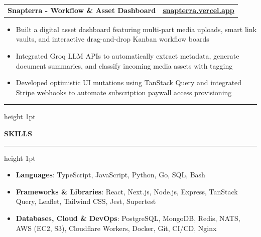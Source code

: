 \documentclass[a4paper,10pt]{article}
\makeatletter
\newcommand{\cvsection}[1]{%
  \vspace{0pt}%
  \par\noindent%
  {\color{bordergray}\hrule height 1pt}%
  \par\nobreak\vskip 0pt%
  \begingroup%
  \setlength{\fboxsep}{3.5pt}%
  \colorbox{bannerblue}{\parbox{\dimexpr\textwidth-2\fboxsep\relax}{\centering\textbf{\fontsize{9pt}{10.5pt}\selectfont #1}}}%
  \endgroup%
  \par\nobreak\vskip 0pt%
  {\color{bordergray}\hrule height 1pt}%
  \par\vspace{6.5pt}%
}
\newcommand{\resumeItemHeader}[2]{%
  \vspace{1pt}%
  \noindent%
  \begin{tabular*}{\textwidth}{@{}l@{\extracolsep{\fill}}r@{}}
    \textbf{\fontsize{9pt}{10.5pt}\selectfont #1} & \textbf{\fontsize{9pt}{10.5pt}\selectfont #2} \\
  \end{tabular*}\par\vspace{0pt}%
}
\makeatother
\begin{document}
\resumeItemHeader{Snapterra - Workflow \& Asset Dashboard}{\href{https://snapterra.vercel.app}{\underline{snapterra.vercel.app}}}
\begin{itemize}
    \item Built a digital asset dashboard featuring multi-part media uploads, smart link vaults, and interactive drag-and-drop Kanban workflow boards
    \item Integrated Groq LLM APIs to automatically extract metadata, generate document summaries, and classify incoming media assets with tagging
    \item Developed optimistic UI mutations using TanStack Query and integrated Stripe webhooks to automate subscription paywall access provisioning
\end{itemize}

\vspace{0.5pt}

\cvsection{SKILLS}
\begin{itemize}
    \item \textbf{Languages}: TypeScript, JavaScript, Python, Go, SQL, Bash
    \item \textbf{Frameworks \& Libraries}: React, Next.js, Node.js, Express, TanStack Query, Leaflet, Tailwind CSS, Jest, Supertest
    \item \textbf{Databases, Cloud \& DevOps}: PostgreSQL, MongoDB, Redis, NATS, AWS (EC2, S3), Cloudflare Workers, Docker, Git, CI/CD, Nginx
\end{itemize}

\vspace{0.5pt}
\end{document}
